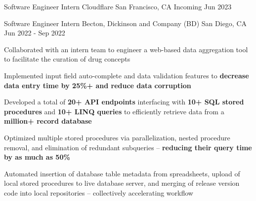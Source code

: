 

\begin{cventries}

  \cventry
  {Software Engineer Intern} %
  {Cloudflare} %
  {San Francisco, CA} %
  {Incoming Jun 2023} %
  {\begin{cvitems} %
    \end{cvitems}
  }

  \vspace{-1.5em}

  \cventry
  {Software Engineer Intern} %
  {Becton, Dickinson and Company (BD)} %
  {San Diego, CA} %
  {Jun 2022 - Sep 2022} %
  {\begin{cvitems} %
      \item {Collaborated with an intern team to engineer a web-based data aggregation tool to facilitate the curation of drug concepts}
      \item { Implemented input field auto-complete and data validation features to \textbf{decrease data entry time by 25\%+ and reduce data corruption} }
      \item {Developed a total of \textbf{20+ API endpoints} interfacing with \textbf{10+ SQL stored procedures} and \textbf{10+ LINQ queries} to efficiently retrieve data from a \textbf{million+ record database}}
      \item {Optimized multiple stored procedures via parallelization, nested procedure removal, and elimination of redundant subqueries -- \textbf{reducing their query time by as much as 50\%}}
      \item {Automated insertion of database table metadata from spreadsheets, upload of local stored procedures to live database server, and merging of release version code into local repositories -- collectively accelerating workflow}
    \end{cvitems}
  }


\end{cventries}
